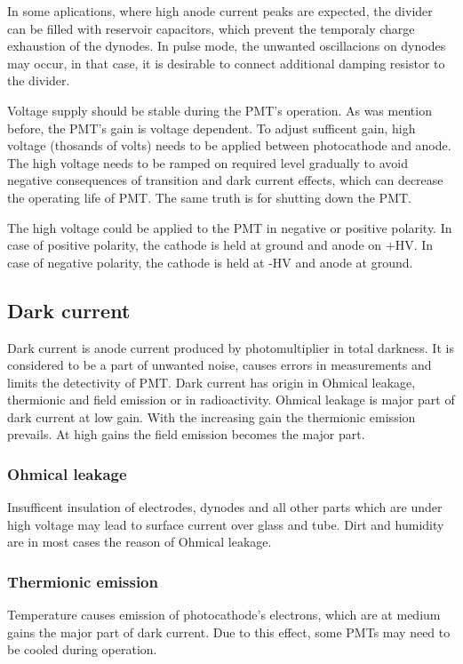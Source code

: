 \par
In some aplications, where high anode current peaks are expected, the divider can be filled with reservoir capacitors, which prevent the temporaly charge exhaustion of the dynodes. In pulse mode, the unwanted oscillacions on dynodes may occur, in that case, it is desirable to connect additional damping resistor to the divider.
\par
Voltage supply should be stable during the PMT's operation. As was mention before, the PMT's gain is voltage dependent. To adjust sufficent gain, high voltage (thosands of volts) needs to be applied between photocathode and anode. The high voltage needs to be ramped on required level gradually to avoid negative consequences of transition and dark current effects, which can decrease the operating life of PMT. The same truth is for shutting down the PMT.
\par
The high voltage could be applied to the PMT in negative or positive polarity. In case of positive polarity, the cathode is held at ground and anode on +HV. In case of negative polarity, the cathode is held at -HV and anode at ground. 

\subsection{Dark current}
Dark current is anode current produced by photomultiplier in total darkness. It is considered to be a part of unwanted noise, causes errors in measurements and limits the detectivity of PMT. Dark current has origin in Ohmical leakage, thermionic and field emission or in radioactivity. Ohmical leakage is major part of dark current at low gain. With the increasing gain the thermionic emission prevails. At high gains the field emission becomes the major part.
\subsubsection{Ohmical leakage}
Insufficent insulation of electrodes, dynodes and all other parts which are under high voltage may lead to surface current over glass and tube. Dirt and humidity are in most cases the reason of Ohmical leakage.

\subsubsection{Thermionic emission}
Temperature causes emission of photocathode's electrons, which are at medium gains the major part of dark current.  Due to this effect, some PMTs may need to be cooled during operation.
